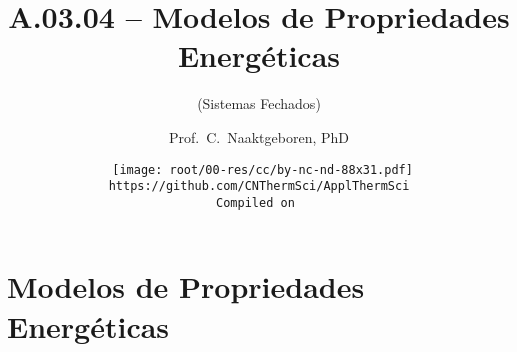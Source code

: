 \makeatletter
\immediate{} %
\makeatother


\title{A.03.04 -- Modelos de Propriedades Energéticas}
\subtitle{(Sistemas Fechados)}
\author{Prof.~C.~Naaktgeboren, PhD}
\date{{\scriptsize\tt%
    \texttt{[image: root/00-res/cc/by-nc-nd-88x31.pdf]}\\[\smallskipamount]
    https://github.com/CNThermSci/ApplThermSci\\
    Compiled on 
}}

\logo{%
    \parbox{158mm}{%
        \texttt{[image: root/00-res/UTFPR/UTFPR-logo-A.pdf]}\hfill%
        \texttt{[image: root/00-res/logo/CNThermSci-logo-A.pdf]}%
}} %
\frame{\titlepage}

\frame{\tableofcontents}

\section{Modelos de Propriedades Energéticas}

